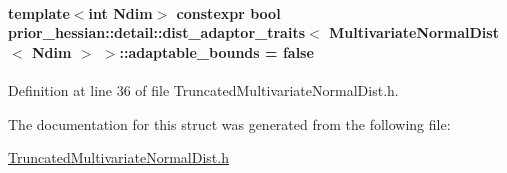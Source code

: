 \paragraph[{\texorpdfstring{adaptable\+\_\+bounds}{adaptable_bounds}}]{\setlength{\rightskip}{0pt plus 5cm}template$<$int Ndim$>$ constexpr bool {\bf prior\+\_\+hessian\+::detail\+::dist\+\_\+adaptor\+\_\+traits}$<$ {\bf Multivariate\+Normal\+Dist}$<$ Ndim $>$ $>$\+::adaptable\+\_\+bounds = false\hspace{0.3cm}{\ttfamily [static]}}\hypertarget{structprior__hessian_1_1detail_1_1dist__adaptor__traits_3_01MultivariateNormalDist_3_01Ndim_01_4_01_4_a17273f68ee0cf8fb1f56166c08611948}{}\label{structprior__hessian_1_1detail_1_1dist__adaptor__traits_3_01MultivariateNormalDist_3_01Ndim_01_4_01_4_a17273f68ee0cf8fb1f56166c08611948}


Definition at line 36 of file Truncated\+Multivariate\+Normal\+Dist.\+h.



The documentation for this struct was generated from the following file\+:\begin{DoxyCompactItemize}
\item 
\hyperlink{TruncatedMultivariateNormalDist_8h}{Truncated\+Multivariate\+Normal\+Dist.\+h}\end{DoxyCompactItemize}
